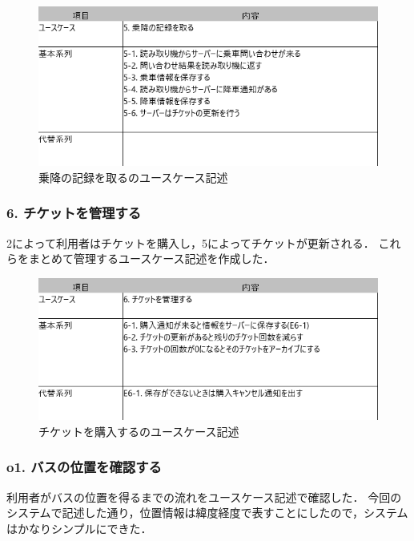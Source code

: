 \documentclass[documentclass]{jsarticle}
\begin{document}
\begin{figure}[H]
  \begin{center}
    \includegraphics*[scale=0.6]{figure/4-5.png}
  \end{center}
  \caption{乗降の記録を取るのユースケース記述}
  \label{fig:5-4}
\end{figure}

\subsubsection*{6. チケットを管理する}
2によって利用者はチケットを購入し，5によってチケットが更新される．
これらをまとめて管理するユースケース記述を作成した．


\begin{figure}[H]
  \begin{center}
    \includegraphics*[scale=0.6]{figure/4-6.png}
  \end{center}
  \caption{チケットを購入するのユースケース記述}
  \label{fig:4-6}
\end{figure}

\subsubsection*{o1. バスの位置を確認する}
利用者がバスの位置を得るまでの流れをユースケース記述で確認した．
今回のシステムで記述した通り，位置情報は緯度経度で表すことにしたので，システムはかなりシンプルにできた．
\end{document}
